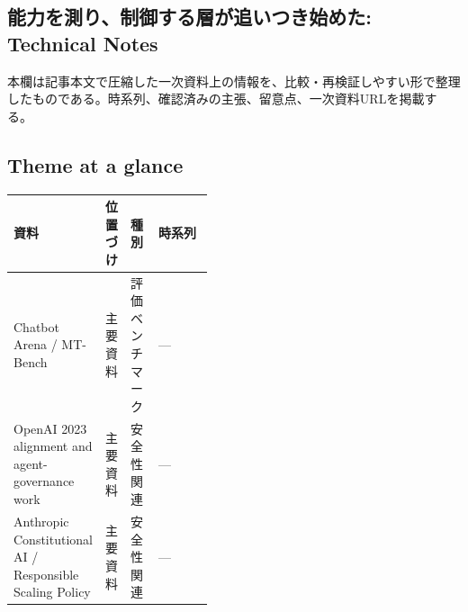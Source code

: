 \subsection*{能力を測り、制御する層が追いつき始めた: Technical Notes}
本欄は記事本文で圧縮した一次資料上の情報を、比較・再検証しやすい形で整理したものである。時系列、確認済みの主張、留意点、一次資料URLを掲載する。
\medskip
\subsection*{Theme at a glance}
\begin{center}
\footnotesize
\begin{tabularx}{\linewidth}{@{}p{0.20\linewidth}p{0.10\linewidth}p{0.14\linewidth}X@{}}
\toprule
資料 & 位置づけ & 種別 & 時系列 \\
\midrule
Chatbot Arena / MT-Bench & 主要資料 & 評価ベンチマーク & — \\
OpenAI 2023 alignment and agent-governance work & 主要資料 & 安全性関連 & — \\
Anthropic Constitutional AI / Responsible Scaling Policy & 主要資料 & 安全性関連 & — \\
\bottomrule
\end{tabularx}
\end{center}
\normalsize

